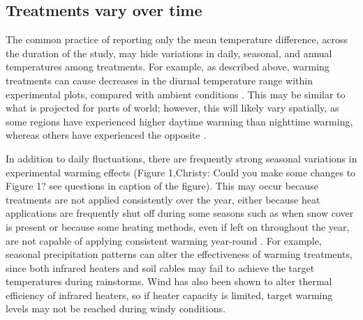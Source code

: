 \documentclass{article}
\begin{document}
\subsection* {Treatments vary over time}
The common practice of reporting only the mean temperature difference, across the duration of the study, may hide variations in daily, seasonal, and annual temperatures among treatments. For example, as described above, warming treatments can cause decreases in the diurnal temperature range within experimental plots, compared with ambient conditions \citep{hoeppner2012}. This may be similar to what is projected for parts of world; however, this will likely vary spatially, as some regions have experienced higher daytime warming than nighttime warming, whereas others have experienced the opposite \citep{ipcc2013}. 
\par In addition to daily fluctuations, there are frequently strong seasonal variations in experimental warming effects (Figure 1,Christy: Could you make some changes to Figure 1? see questions in caption of the figure). This may occur because treatments are not applied consistently over the year, either because heat applications are frequently shut off during some seasons such as when snow cover is present or because some heating methods, even if left on throughout the year, are not capable of applying consistent warming year-round \citep[e.g.][]{clark2014a,clark2014b,hagedorn2010}. For example, seasonal precipitation patterns can alter the effectiveness of warming treatments, since both infrared heaters and soil cables may fail to achieve the target temperatures during  rainstorms\citep{peterjohn1993,hoeppner2012}. Wind has also been shown to alter thermal efficiency of infrared heaters, so if heater capacity is limited, target warming levels may not be reached during windy conditions\citep{kimball2005,kimball2008}.
\end{document}
